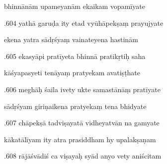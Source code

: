\documentclass[article,12pt,a4paper]{memoir}%
\newcounter{parCount}
\begin{document}
	  
	  \pstart \leavevmode%
	bhinnānām upameyanām ekaikam vopamīyate 
	{}
	\pend%
      

	  
	  \pstart {}.604 yathā garuḍa ity etad vyūhāpekṣaṃ prayujyate 
	{}
	\pend%
      

	  
	  \pstart \leavevmode%
	ekena yatra sādṛśyaṃ vainateyena hastinām 
	{}
	\pend%
      

	  
	  \pstart {}.605 ekasyāpi pratīyeta bhinnā pratikṛtiḥ saha 
	{}
	\pend%
      

	  
	  \pstart \leavevmode%
	kāśyapasyeti tenāyaṃ pratyekam avatiṣṭhate 
	{}
	\pend%
      

	  
	  \pstart {}.606 meghāḥ śaila ivety ukte samastānāṃ pratīyate 
	{}
	\pend%
      

	  
	  \pstart \leavevmode%
	sādṛśyam giriṇaikena pratyekaṃ tena bhidyate 
	{}
	\pend%
      

	  
	  \pstart {}.607 chāpekṣā tadviṣayatā vidheyatvān na gamyate 
	{}
	\pend%
      

	  
	  \pstart \leavevmode%
	kākatālīyam ity atra prasiddham hy upalakṣaṇam 
	{}
	\pend%
      

	  
	  \pstart {}.608 rājāśvādiś ca viṣayaḥ syād anyo vety aniścitam 
	{}
	\pend%
      
\end{document}
